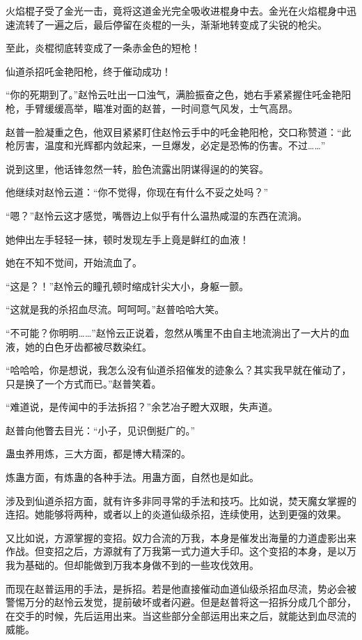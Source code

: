 
\begin{this_body}

火焰棍子受了金光一击，竟将这道金光完全吸收进棍身中去。金光在火焰棍身中迅速流转了一遍之后，最后停留在炎棍的一头，渐渐地转变成了尖锐的枪尖。

至此，炎棍彻底转变成了一条赤金色的短枪！

仙道杀招吒金艳阳枪，终于催动成功！

“你的死期到了。”赵怜云吐出一口浊气，满脸振奋之色，她右手紧紧握住吒金艳阳枪，手臂缓缓高举，瞄准对面的赵普，一时间意气风发，士气高昂。

赵普一脸凝重之色，他双目紧紧盯住赵怜云手中的吒金艳阳枪，交口称赞道：“此枪厉害，温度和光辉都内敛起来，一旦爆发，必定是恐怖的伤害。不过……”

说到这里，他话锋忽然一转，脸色流露出阴谋得逞的的笑容。

他继续对赵怜云道：“你不觉得，你现在有什么不妥之处吗？”

“嗯？”赵怜云这才感觉，嘴唇边上似乎有什么温热咸湿的东西在流淌。

她伸出左手轻轻一抹，顿时发现左手上竟是鲜红的血液！

她在不知不觉间，开始流血了。

“这是？！”赵怜云的瞳孔顿时缩成针尖大小，身躯一颤。

“这就是我的杀招血尽流。呵呵呵。”赵普哈哈大笑。

“不可能？你明明……”赵怜云正说着，忽然从嘴里不由自主地流淌出了一大片的血液，她的白色牙齿都被尽数染红。

“哈哈哈，你是想说，我怎么没有仙道杀招催发的迹象么？其实我早就在催动了，只是换了一个方式而已。”赵普笑着。

“难道说，是传闻中的手法拆招？”余艺冶子瞪大双眼，失声道。

赵普向他瞥去目光：“小子，见识倒挺广的。”

蛊虫养用炼，三大方面，都是博大精深的。

炼蛊方面，有炼蛊的各种手法。用蛊方面，自然也是如此。

涉及到仙道杀招方面，就有许多非同寻常的手法和技巧。比如说，焚天魔女掌握的连招。她能够将两种，或者以上的炎道仙级杀招，连续使用，达到更强的效果。

又比如说，方源掌握的变招。奴力合流的万我，本身是催发出海量的力道虚影出来作战。但变招之后，方源就有了万我第一式力道大手印。这个变招的本身，是以万我为基础的。但却能做到万我本身做不到的一些攻伐效用。

而现在赵普运用的手法，是拆招。若是他直接催动血道仙级杀招血尽流，势必会被警惕万分的赵怜云发觉，提前破坏或者闪避。但是赵普将这一招拆分成几个部分，在交手的时候，先后运用出来。当这些部分全部运用出来之后，就能达到血尽流的威能。


\end{this_body}
